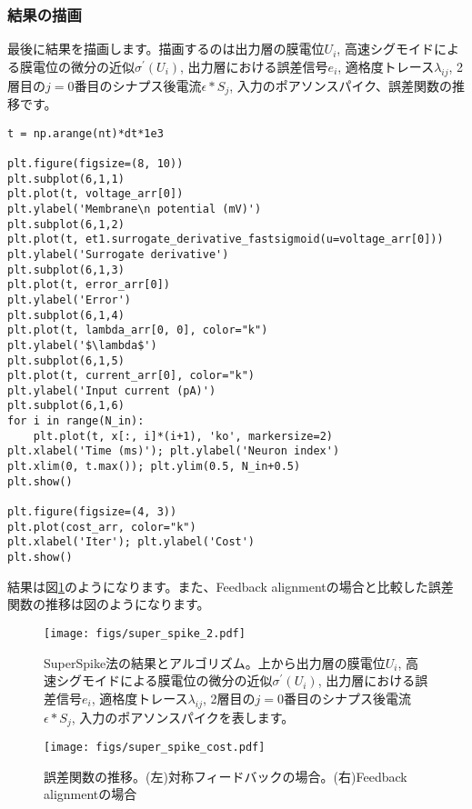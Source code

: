 \subsubsection{結果の描画}
最後に結果を描画します。描画するのは出力層の膜電位$U_i$, 高速シグモイドによる膜電位の微分の近似$\sigma^\prime (U_i)$, 出力層における誤差信号$e_i$, 適格度トレース$\lambda_{ij}$, 2層目の$j=0$番目のシナプス後電流$\epsilon * S_j$, 入力のポアソンスパイク、誤差関数の推移です。
\begin{verbatim}
t = np.arange(nt)*dt*1e3

plt.figure(figsize=(8, 10))
plt.subplot(6,1,1)
plt.plot(t, voltage_arr[0])
plt.ylabel('Membrane\n potential (mV)')
plt.subplot(6,1,2)
plt.plot(t, et1.surrogate_derivative_fastsigmoid(u=voltage_arr[0]))
plt.ylabel('Surrogate derivative')
plt.subplot(6,1,3)
plt.plot(t, error_arr[0])
plt.ylabel('Error')
plt.subplot(6,1,4)
plt.plot(t, lambda_arr[0, 0], color="k")
plt.ylabel('$\lambda$')
plt.subplot(6,1,5)
plt.plot(t, current_arr[0], color="k")
plt.ylabel('Input current (pA)')
plt.subplot(6,1,6)
for i in range(N_in):    
    plt.plot(t, x[:, i]*(i+1), 'ko', markersize=2)
plt.xlabel('Time (ms)'); plt.ylabel('Neuron index') 
plt.xlim(0, t.max()); plt.ylim(0.5, N_in+0.5)
plt.show()

plt.figure(figsize=(4, 3))
plt.plot(cost_arr, color="k")
plt.xlabel('Iter'); plt.ylabel('Cost') 
plt.show()
\end{verbatim}

結果は図\ref{fig:super_spike}のようになります。また、Feedback alignmentの場合と比較した誤差関数の推移は図のようになります。
\begin{figure}[htbp]
    \centering
    \texttt{[image: figs/super\_spike\_2.pdf]}
    \caption{SuperSpike法の結果とアルゴリズム。上から出力層の膜電位$U_i$, 高速シグモイドによる膜電位の微分の近似$\sigma^\prime (U_i)$, 出力層における誤差信号$e_i$, 適格度トレース$\lambda_{ij}$, 2層目の$j=0$番目のシナプス後電流$\epsilon * S_j$, 入力のポアソンスパイクを表します。}
    \label{fig:super_spike}
\end{figure}
\begin{figure}[htbp]
    \centering
    \texttt{[image: figs/super\_spike\_cost.pdf]}
    \caption{誤差関数の推移。(左)対称フィードバックの場合。(右)Feedback alignmentの場合}
    \label{fig:super_spike_2}
\end{figure}

